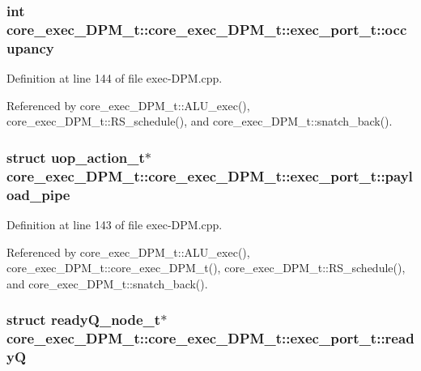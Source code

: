 \subsubsection[{occupancy}]{\setlength{\rightskip}{0pt plus 5cm}int core\_\-exec\_\-DPM\_\-t::core\_\-exec\_\-DPM\_\-t::exec\_\-port\_\-t::occupancy}\label{structcore__exec__DPM__t_1_1exec__port__t_aa00af896d341748fc352988cb528ce7}




Definition at line 144 of file exec-DPM.cpp.

Referenced by core\_\-exec\_\-DPM\_\-t::ALU\_\-exec(), core\_\-exec\_\-DPM\_\-t::RS\_\-schedule(), and core\_\-exec\_\-DPM\_\-t::snatch\_\-back().
\subsubsection[{payload\_\-pipe}]{\setlength{\rightskip}{0pt plus 5cm}struct {\bf uop\_\-action\_\-t}$\ast$ core\_\-exec\_\-DPM\_\-t::core\_\-exec\_\-DPM\_\-t::exec\_\-port\_\-t::payload\_\-pipe\hspace{0.3cm}{\tt  [read]}}\label{structcore__exec__DPM__t_1_1exec__port__t_dfdef9ad8a9874cfbb1f99abb1cf203e}




Definition at line 143 of file exec-DPM.cpp.

Referenced by core\_\-exec\_\-DPM\_\-t::ALU\_\-exec(), core\_\-exec\_\-DPM\_\-t::core\_\-exec\_\-DPM\_\-t(), core\_\-exec\_\-DPM\_\-t::RS\_\-schedule(), and core\_\-exec\_\-DPM\_\-t::snatch\_\-back().
\subsubsection[{readyQ}]{\setlength{\rightskip}{0pt plus 5cm}struct {\bf readyQ\_\-node\_\-t}$\ast$ core\_\-exec\_\-DPM\_\-t::core\_\-exec\_\-DPM\_\-t::exec\_\-port\_\-t::readyQ\hspace{0.3cm}{\tt  [read]}}\label{structcore__exec__DPM__t_1_1exec__port__t_46f43b948280321c354268669a523565}




